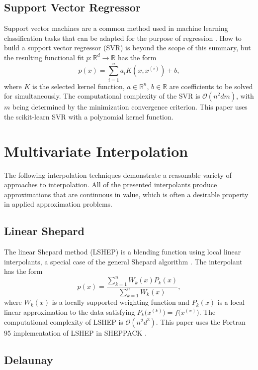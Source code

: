 \documentclass[smallextended]{svjour3}       %
\begin{document}
\subsection{Support Vector Regressor}
Support vector machines are a common method used in machine learning classification tasks that can be adapted for the purpose of regression \cite{basak2007support}. How to build a support vector regressor (SVR) is beyond the scope of this summary, but the resulting functional fit $p : \mathbb{R}^d \rightarrow \mathbb{R}$ has the form
$$ p(x)  = \sum_{i=1}^{n}a_i K(x,x^{(i)}) + b ,$$
where $K$ is the selected kernel function, $a \in \mathbb{R}^n$, $b \in \mathbb{R}$ are coefficients to be solved for simultaneously. The computational complexity of the SVR is $\mathcal{O}(n^2dm)$, with $m$ being determined by the minimization convergence criterion. This paper uses the scikit-learn SVR \cite{scikit-learn} with a polynomial kernel function.

\section{Multivariate Interpolation}
The following interpolation techniques demonstrate a reasonable variety of approaches to interpolation. All of the presented interpolants produce approximations that are continuous in value, which is often a desirable property in applied approximation problems.

\subsection{Linear Shepard}
The linear Shepard method (LSHEP) is a blending function using local linear interpolants, a special case of the general Shepard algorithm \cite{thacker2010algorithm}. The interpolant has the form
$$ p(x) = \frac{\sum\limits_{k=1}^{n}W_k(x)P_k(x)}{\sum\limits_{k=1}^{n}W_k(x)} ,$$
where $W_k(x)$ is a locally supported weighting function and $P_k(x)$ is a local linear approximation to the data satisfying $P_k\big(x^{(k)}\big) = f\big(x^{(x)}\big)$. The computational complexity of LSHEP is $\mathcal{O}(n^2d^3)$. This paper uses the Fortran 95 implementation of LSHEP in SHEPPACK \cite{thacker2010algorithm}.


\subsection{Delaunay}
\label{sec:delaunay}
\end{document}
